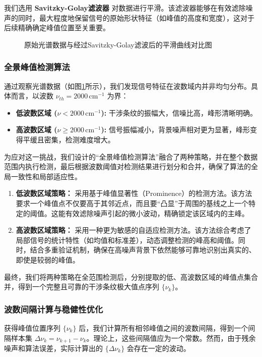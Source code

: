 \documentclass{ctexart} %
\begin{document}
我们选用 \textbf{Savitzky-Golay滤波器} 对数据进行平滑。该滤波器能够在有效滤除噪声的同时，最大程度地保留信号的原始形状特征（如峰值的高度和宽度），这对于后续精确确定峰值位置至关重要。

\begin{figure}[htbp]
    \centering
    \caption{原始光谱数据与经过Savitzky-Golay滤波后的平滑曲线对比图}
    \label{fig:smoothing}
\end{figure}

\subsubsection{全景峰值检测算法}
通过观察光谱数据（如图\ref{fig:smoothing}所示），我们发现信号特征在波数域内并非均匀分布。具体而言，以波数 $\nu_{th} = 2000 \, \text{cm}^{-1}$ 为界：
\begin{itemize}
    \item \textbf{低波数区域 ($\nu < 2000 \, \text{cm}^{-1}$):} 干涉条纹的振幅大，信噪比高，峰形清晰明确。
    \item \textbf{高波数区域 ($\nu \ge 2000 \, \text{cm}^{-1}$):} 信号振幅减小，背景噪声相对更为显著，峰形变得平缓且密集，检测难度增大。
\end{itemize}

为应对这一挑战，我们设计的“全景峰值检测算法”融合了两种策略，并在整个数据范围内执行检测，最后根据波数阈值对检测结果进行划分和合并，确保了算法的全局一致性和局部适应性。
\begin{enumerate}
    \item \textbf{低波数区域策略：} 采用基于峰值显著性（Prominence）的检测方法。该方法要求一个峰值点不仅要高于其邻近点，而且要“凸显”于周围的基线之上一个特定的阈值。这能有效滤除噪声引起的微小波动，精确锁定该区域内的主峰。
    \item \textbf{高波数区域策略：} 采用一种更为敏感的自适应检测方法。该方法综合考虑了局部信号的统计特性（如均值和标准差），动态调整检测的峰高和阈值。同时，结合多重验证机制，确保在高噪声背景下依然能够可靠地识别出真实的、即使是较弱的峰值。
\end{enumerate}
最终，我们将两种策略在全范围检测后，分别提取的低、高波数区域的峰值点集合并，得到一个完整且可靠的干涉条纹极大值点序列 $\{\nu_k\}$。

\subsubsection{波数间隔计算与稳健性优化}
获得峰值位置序列 $\{\nu_k\}$ 后，我们计算所有相邻峰值之间的波数间隔，得到一个间隔样本集 $\Delta\nu_k = \nu_{k+1} - \nu_k$。理论上，这些间隔值应为一个常数。然而，由于残余噪声和算法误差，实际计算出的 $\{\Delta\nu_k\}$ 会存在一定的波动。
\end{document}
